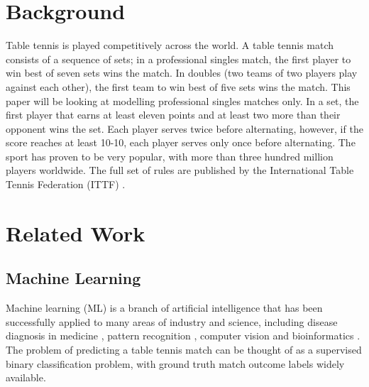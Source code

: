 \section{Background}
Table tennis is played competitively across the world. A table tennis match consists of a sequence of sets; in a professional singles match, the first player to win best of seven sets wins the match. In doubles (two teams of two players play against each other), the first team to win best of five sets wins the match. This paper will be looking at modelling professional singles matches only.
In a set, the first player that earns at least eleven points and at least two more than their opponent wins the set. Each player serves twice before alternating, however, if the score reaches at least 10-10, each player serves only once before alternating.
The sport has proven to be very popular, with more than three hundred million players worldwide. %
The full set of rules are published by the International Table Tennis Federation (ITTF) \cite{ITTF}.

\section{Related Work} \label{sec:relatedwork}
\subsection{Machine Learning}
Machine learning (ML) is a branch of artificial intelligence that has been successfully applied to many areas of industry and science, including disease diagnosis in medicine \cite{kourou2015machine}, pattern recognition \cite{weiss1989empirical}, computer vision \cite{khan2020machine} and bioinformatics \cite{larranaga2006machine}.
The problem of predicting a table tennis match can be thought of as a supervised binary classification problem, with ground truth match outcome labels widely available. %


